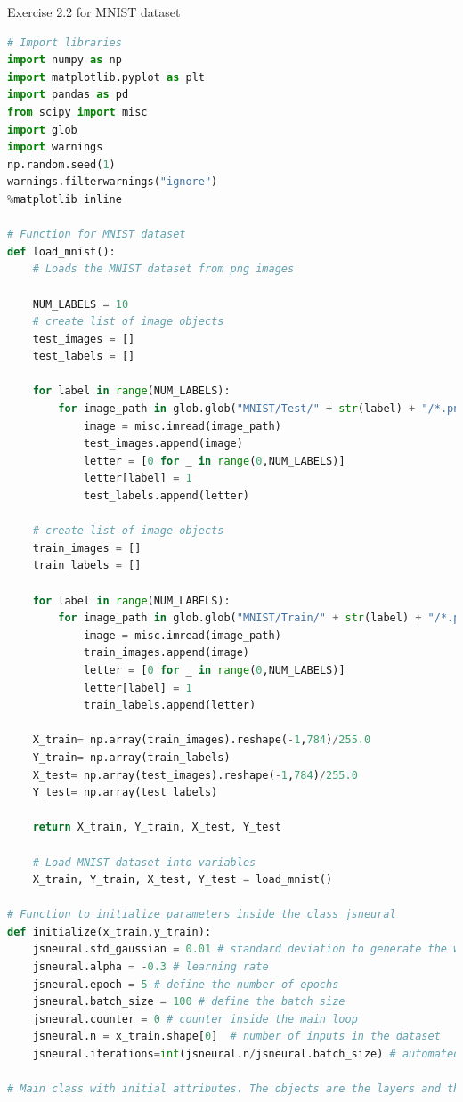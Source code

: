 \documentclass{article}
\begin{document}
Exercise 2.2 for MNIST dataset
\begin{lstlisting}[language=Python]
# Import libraries
import numpy as np
import matplotlib.pyplot as plt
import pandas as pd
from scipy import misc
import glob
import warnings
np.random.seed(1)
warnings.filterwarnings("ignore")
%matplotlib inline

# Function for MNIST dataset
def load_mnist():
    # Loads the MNIST dataset from png images
 
    NUM_LABELS = 10        
    # create list of image objects
    test_images = []
    test_labels = []    
    
    for label in range(NUM_LABELS):
        for image_path in glob.glob("MNIST/Test/" + str(label) + "/*.png"):
            image = misc.imread(image_path)
            test_images.append(image)
            letter = [0 for _ in range(0,NUM_LABELS)]    
            letter[label] = 1
            test_labels.append(letter)  
            
    # create list of image objects
    train_images = []
    train_labels = []    
    
    for label in range(NUM_LABELS):
        for image_path in glob.glob("MNIST/Train/" + str(label) + "/*.png"):
            image = misc.imread(image_path)
            train_images.append(image)
            letter = [0 for _ in range(0,NUM_LABELS)]    
            letter[label] = 1
            train_labels.append(letter)                  
            
    X_train= np.array(train_images).reshape(-1,784)/255.0
    Y_train= np.array(train_labels)
    X_test= np.array(test_images).reshape(-1,784)/255.0
    Y_test= np.array(test_labels)
    
    return X_train, Y_train, X_test, Y_test
    
    # Load MNIST dataset into variables
    X_train, Y_train, X_test, Y_test = load_mnist()
    
# Function to initialize parameters inside the class jsneural
def initialize(x_train,y_train):
    jsneural.std_gaussian = 0.01 # standard deviation to generate the weights
    jsneural.alpha = -0.3 # learning rate
    jsneural.epoch = 5 # define the number of epochs
    jsneural.batch_size = 100 # define the batch size 
    jsneural.counter = 0 # counter inside the main loop
    jsneural.n = x_train.shape[0]  # number of inputs in the dataset
    jsneural.iterations=int(jsneural.n/jsneural.batch_size) # automated - based on the batch size
  
# Main class with initial attributes. The objects are the layers and the methods are called through jsneural.
  

\end{lstlisting}
\end{document}
